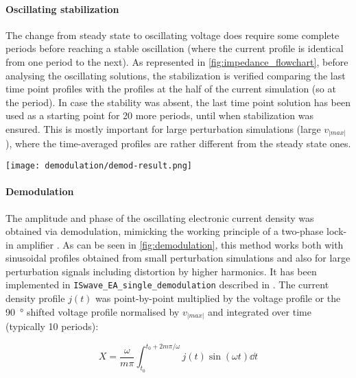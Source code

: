 \paragraph{Oscillating stabilization}
The change from steady state to oscillating voltage does require some complete periods before reaching a stable oscillation (where the current profile is identical from one period to the next).
As represented in \cref{fig:impedance_flowchart}, before analysing the oscillating solutions, the stabilization is verified comparing the last time point profiles with the profiles at the half of the current simulation (so at the  period).
In case the stability was absent, the last time point solution has been used as a starting point for 20 more periods, until when stabilization was ensured.
This is mostly important for large perturbation simulations (large $v_|max|$), where the time\hyp{}averaged profiles are rather different from the steady state ones.

\begin{SCfigure}
	\centering
	\texttt{[image: demodulation/demod-result.png]}
	\label{fig:demodulation}
\end{SCfigure}

\paragraph{Demodulation}
The amplitude and phase of the oscillating electronic current density was obtained via
demodulation, mimicking the working principle of a two-phase lock-in amplifier \cite{WikipediaLockIn}.
As can be seen in \cref{fig:demodulation}, this method works both with sinusoidal profiles obtained from small perturbation simulations and also for large perturbation signals including distortion by higher harmonics.
It has been implemented in \texttt{ISwave\_EA\_single\_demodulation} described in .
The current density profile $j(t)$ was point-by-point multiplied by the voltage profile or the \SI{90}{\degree} shifted
voltage profile normalised by $v_|max|$ and integrated over time (typically 10 periods):

\begin{equation}
X = \frac{\omega}{m \pi} \int_{t_0}^{t_0+2m\pi / \omega} j(t) \sin(\omega t) \dd t
\end{equation}

